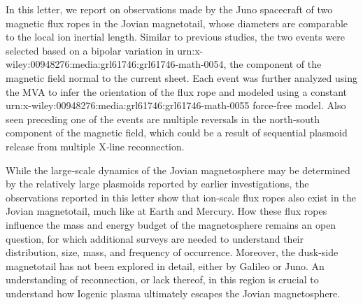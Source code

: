 In this letter, we report on observations made by the Juno spacecraft of two magnetic flux ropes in the Jovian magnetotail, whose diameters are comparable to the local ion inertial length. Similar to previous studies, the two events were selected based on a bipolar variation in urn:x-wiley:00948276:media:grl61746:grl61746-math-0054, the component of the magnetic field normal to the current sheet. Each event was further analyzed using the MVA to infer the orientation of the flux rope and modeled using a constant urn:x-wiley:00948276:media:grl61746:grl61746-math-0055 force‐free model. Also seen preceding one of the events are multiple reversals in the north‐south component of the magnetic field, which could be a result of sequential plasmoid release from multiple X‐line reconnection.

While the large‐scale dynamics of the Jovian magnetosphere may be determined by the relatively large plasmoids reported by earlier investigations, the observations reported in this letter show that ion‐scale flux ropes also exist in the Jovian magnetotail, much like at Earth and Mercury. How these flux ropes influence the mass and energy budget of the magnetosphere remains an open question, for which additional surveys are needed to understand their distribution, size, mass, and frequency of occurrence. Moreover, the dusk‐side magnetotail has not been explored in detail, either by Galileo or Juno. An understanding of reconnection, or lack thereof, in this region is crucial to understand how Iogenic plasma ultimately escapes the Jovian magnetosphere.

